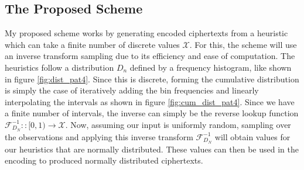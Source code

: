 \documentclass[ %
                    author={Samuel Russell},
                supervisor={Prof. Bogdan Warinschi},
                    degree={MEng},
                     title={Innocuous Ciphertexts},
                  subtitle={The DE-CENSOR Scheme},
                      type={research},
                      year={2018} ]{dissertation}
\begin{document}
\subsection{The Proposed Scheme}

My proposed scheme works by generating encoded ciphertexts from a heuristic which can take a finite number of discrete values $\mathcal{X}$. For this, the scheme will use an inverse transform sampling due to its efficiency and ease of computation.
The heuristics follow a distribution $D_n$ defined by a frequency histogram, like shown in figure \ref{fig:dist_pat4}.
Since this is discrete, forming the cumulative distribution is simply the case of iteratively adding the bin frequencies and linearly interpolating the intervals as shown in figure \ref{fig:cum_dist_pat4}.
Since we have a finite number of intervals, the inverse can simply be the reverse lookup function $\mathcal{F}^{-1}_{D_N} :: [0,1) \rightarrow \mathcal{X}$.
Now, assuming our input is uniformly random, sampling over the observations and applying this inverse transform $\mathcal{F}^{-1}_{D_N}$ will obtain values for our heuristics that are normally distributed.
These values can then be used in the encoding to produced normally distributed ciphertexts.
\end{document}
